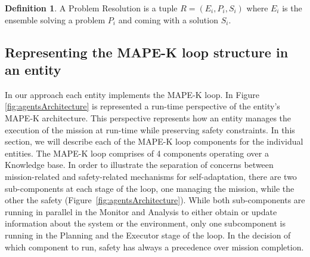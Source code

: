 \documentclass[journal]{IEEEtran}
\theoremstyle{definition}
\newtheorem{definition}{Definition}
\newcommand\patrizio[1]{\nb{Patrizio}{#1}}
\newcommand\ivano[1]{\nb{Ivano}{#1}}
\begin{document}
\begin{definition}
A Problem Resolution is a tuple $R=(E_i, P_i, S_i)$ where $E_i$ is the ensemble  solving a problem $P_i$ and coming with a solution $S_i$.
\end{definition}

\subsection{Representing the MAPE-K loop structure in an entity}


In our approach each entity implements the
MAPE-K loop. 
In Figure \ref{fig:agentsArchitecture} is represented a run-time perspective of the entity's MAPE-K architecture. This perspective represents how an entity manages the execution of the mission at run-time while preserving safety constraints.
In this section, we will describe each of the MAPE-K loop components for the individual entities. The MAPE-K loop comprises of 4 
components operating over a Knowledge base. In order to illustrate the separation of concerns between mission-related and safety-related mechanisms for self-adaptation,
there are two sub-components at each stage of the loop, one managing the mission, while the other the safety (Figure~\ref{fig:agentsArchitecture}). While both sub-components are running in parallel in the Monitor and Analysis to either obtain or update information about the system or the environment, only one subcomponent is running in the Planning and the Executor stage of the loop. In the decision of which component to run, safety has always a precedence over mission completion.
\end{document}
